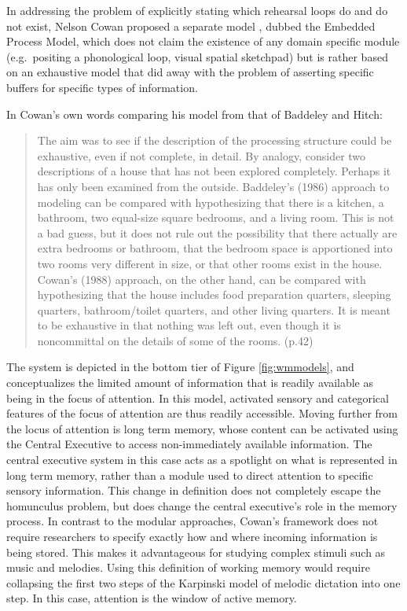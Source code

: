 \documentclass[12pt,]{book}
\begin{document}
In addressing the problem of explicitly stating which rehearsal loops do and do not exist, Nelson Cowan proposed a separate model \citep{cowanEvolvingConceptionsMemory1988, cowanWorkingMemoryCapacity2005}, dubbed the Embedded Process Model, which does not claim the existence of any domain specific module (e.g.~positing a phonological loop, visual spatial sketchpad) but is rather based on an exhaustive model that did away with the problem of asserting specific buffers for specific types of information.

In Cowan's own words comparing his model from that of Baddeley and Hitch:

\begin{quote}
The aim was to see if the description of the processing structure could be exhaustive, even if not complete, in detail. By analogy, consider two descriptions of a house that has not been explored completely. Perhaps it has only been examined from the outside. Baddeley's (1986) approach to modeling can be compared with hypothesizing that there is a kitchen, a bathroom, two equal-size square bedrooms, and a living room. This is not a bad guess, but it does not rule out the possibility that there actually are extra bedrooms or bathroom, that the bedroom space is apportioned into two rooms very different in size, or that other rooms exist in the house. Cowan's (1988) approach, on the other hand, can be compared with hypothesizing that the house includes food preparation quarters, sleeping quarters, bathroom/toilet quarters, and other living quarters. It is meant to be exhaustive in that nothing was left out, even though it is noncommittal on the details of some of the rooms. (p.42) \citep{cowanWorkingMemoryCapacity2005}
\end{quote}

The system is depicted in the bottom tier of Figure \ref{fig:wmmodels}, and conceptualizes the limited amount of information that is readily available as being in the focus of attention.
In this model, activated sensory and categorical features of the focus of attention are thus readily accessible.
Moving further from the locus of attention is long term memory, whose content can be activated using the Central Executive to access non-immediately available information.
The central executive system in this case acts as a spotlight on what is represented in long term memory, rather than a module used to direct attention to specific sensory information.
This change in definition does not completely escape the homunculus problem, but does change the central executive's role in the memory process.
In contrast to the modular approaches, Cowan's framework does not require researchers to specify exactly how and where incoming information is being stored.
This makes it advantageous for studying complex stimuli such as music and melodies.
Using this definition of working memory would require collapsing the first two steps of the Karpinski model of melodic dictation into one step.
In this case, attention is the window of active memory.
\end{document}
